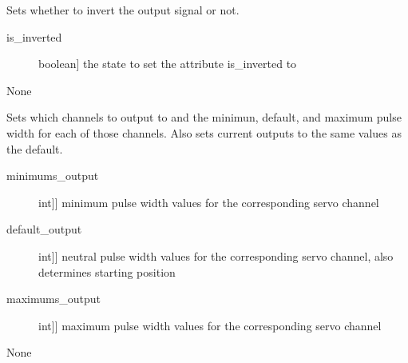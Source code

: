 \documentclass[letterpaper,10pt,english]{sphinxmanual}
\begin{document}
\begin{fulllineitems}
\begin{fulllineitems}
\label{\detokenize{specific:SideLipOutput.SideLipOutput.set_inversion}}
\sphinxAtStartPar
Sets whether to invert the output signal or not.

\sphinxAtStartPar
{}
\begin{description}
\item[{is\_inverted}] \leavevmode{[}boolean{]}
\sphinxAtStartPar
the state to set the attribute is\_inverted to

\end{description}

\sphinxAtStartPar
{}

\sphinxAtStartPar
None

\end{fulllineitems}


\begin{fulllineitems}
\label{\detokenize{specific:SideLipOutput.SideLipOutput.set_outputs}}
\sphinxAtStartPar
Sets which channels to output to and the minimun, default, and maximum pulse width for each of those channels.
Also sets current outputs to the same values as the default.

\sphinxAtStartPar
{}
\begin{description}
\item[{minimums\_output}] \leavevmode{[}{[}int{]}{]}
\sphinxAtStartPar
minimum pulse width values for the corresponding servo channel

\item[{default\_output}] \leavevmode{[}{[}int{]}{]}
\sphinxAtStartPar
neutral pulse width values for the corresponding servo channel, also determines starting position

\item[{maximums\_output}] \leavevmode{[}{[}int{]}{]}
\sphinxAtStartPar
maximum pulse width values for the corresponding servo channel

\end{description}

\sphinxAtStartPar
{}

\sphinxAtStartPar
None

\end{fulllineitems}


\end{fulllineitems}
\end{document}
